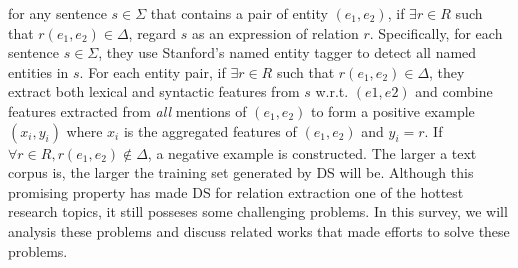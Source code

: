 \documentclass[10pt]{article} %
\theoremstyle{definition}
\theoremstyle{definition}
\begin{document}
for any sentence $s\in\Sigma$ that contains a pair of entity $(e_1,e_2)$, if $\exists{}r\in{}R$ such that $r(e_1,e_2)\in\Delta$, regard $s$ as an expression of relation $r$. 
Specifically, for each sentence $s\in\Sigma$, they use Stanford's named entity tagger to detect all named entities in $s$. 
For each entity pair, if $\exists{}r\in{}R$ such that $r(e_1,e_2)\in\Delta$, they extract both lexical and syntactic features from $s$ w.r.t. $(e1,e2)$ and combine features extracted from \emph{all} mentions of $(e_1,e_2)$ 
to form a positive example $(x_i,y_i)$ where $x_i$ is the aggregated features of $(e_1,e_2)$ and $y_i=r$. 
If $\forall{}r\in{}R,r(e_1,e_2)\notin\Delta$, a negative example is constructed. 
The larger a text corpus is, the larger the training set generated by DS will be. 
Although this promising property has made DS for relation extraction one of the hottest research topics, it still posseses some challenging problems. 
In this survey, we will analysis these problems and discuss related works that made efforts to solve these problems. 
\end{document}
